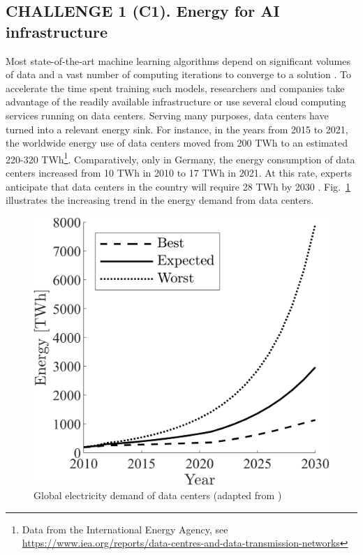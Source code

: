 \subsection{\textbf{CHALLENGE 1} (C1). Energy for AI infrastructure}
Most state-of-the-art machine learning algorithms depend on significant volumes of data and a vast number of computing iterations to converge to a solution \cite{Strubell2019EnergyAP}. To accelerate the time spent training such models, researchers and companies take advantage of the readily available infrastructure or use several cloud computing services running on data centers. Serving many purposes, data centers have turned into a relevant energy sink. For instance, in the years from 2015 to 2021, the worldwide energy use of data centers moved from 200 TWh to an estimated 220-320 TWh\footnote{Data from the International Energy Agency, see \url{https://www.iea.org/reports/data-centres-and-data-transmission-networks}}. Comparatively, only in Germany, the energy consumption of data centers increased from 10 TWh in 2010 to 17 TWh in 2021. At this rate, experts anticipate that data centers in the country will require 28 TWh by 2030 \cite{Hintemann2022Cloudcomputingdrives}. Fig.~\ref{fig:dataCenterEnergy} illustrates the increasing trend in the energy demand from data centers.
\begin{figure}[!t]
	\centering
	\includegraphics[width=0.95\columnwidth]{fig/data_center_energy_consumption.png}
	\caption{Global electricity demand of data centers (adapted from \cite{andrae2015global})}
	\label{fig:dataCenterEnergy}
\end{figure}
